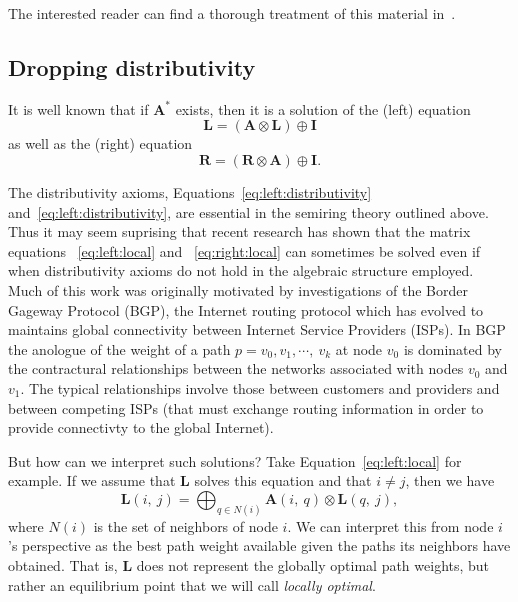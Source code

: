 The interested reader can find a thorough treatment of 
this material in~\cite{gondran_graphs_2008}.   

\subsection{Dropping distributivity} 

It is well known that if $\mathbf{A}^*$ exists, then it 
is a solution of the (left) equation 
\begin{equation}
\label{eq:left:local}
\mathbf{L} = (\mathbf{A}\otimes \mathbf{L}) \oplus \mathbf{I}
\end{equation}
as well as the (right) equation 
\begin{equation}
\label{eq:right:local}
\mathbf{R} = (\mathbf{R}\otimes \mathbf{A}) \oplus \mathbf{I}. 
\end{equation}

The distributivity axioms, 
Equations~\ref{eq:left:distributivity} and~\ref{eq:left:distributivity}, 
are essential in the semiring theory outlined above. 
Thus it may seem suprising that recent research has shown that
the matrix equations ~\ref{eq:left:local} and ~\ref{eq:right:local} 
can sometimes be solved even if when 
distributivity axioms do not hold in the algebraic structure employed. 
Much of this work was originally motivated 
by investigations of the Border Gageway Protocol (BGP), 
the Internet routing protocol which has evolved to 
maintains global connectivity between Internet Service Providers (ISPs). 
In BGP the anologue of the weight of a path 
$p = v_0, v_1, \cdots,\ v_k$ at node $v_0$ 
is dominated by the contractural relationships between 
the networks associated with nodes $v_0$ and $v_1$.
The typical relationships involve those between customers 
and providers and between competing ISPs (that must exchange
routing information in order to provide connectivty to 
the global Internet).  

But how can we interpret such solutions? 
Take Equation~\ref{eq:left:local} for example. 
If we assume that $\mathbf{L}$ solves this equation 
and that $i \neq j$, then we have 
\begin{equation}
\label{eq:left:local:at:i}
\mathbf{L}(i,\ j) = \displaystyle\bigoplus_{q \in N(i)} \mathbf{A}(i,\ q) \otimes \mathbf{L}(q,\ j), 
\end{equation}
where $N(i)$ is the set of neighbors of node $i$. 
We can interpret this from node $i$'s perspective as 
the best path weight available given the paths its neighbors 
have obtained. 
That is, $\mathbf{L}$ does not represent the globally optimal 
path weights, but rather an equilibrium point that we will 
call \emph{locally optimal}. 


